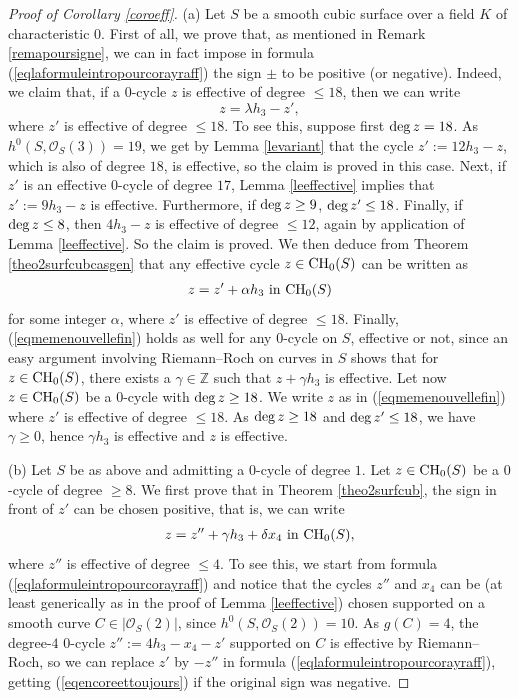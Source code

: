 \documentclass[10pt]{article}
\begin{document}
\begin{proof}[Proof of Corollary \ref{coroeff}]  (a)  Let $S$ be a smooth cubic surface over a field $K$ of characteristic $0$. First of all, we prove that, as mentioned  in Remark \ref{remapoursigne},  we can in fact impose in formula (\ref{eqlaformuleintropourcorayraff}) the sign $\pm$ to be positive (or negative). Indeed, we claim that, if a $0$-cycle  $z$ is effective of degree $\leq 18$, then we can write
$$z=\lambda h_3-z',$$
where $z'$ is effective of degree $\leq 18$. To see this, suppose first ${\rm deg}\,z=18$. As $h^0(S,\mathcal{O}_S(3))=19$, we get by  Lemma \ref{levariant} that   the cycle $z':=12 h_3-z$, which is also  of  degree $18$, is effective, so the claim is proved in this case. Next, if $z'$ is an effective $0$-cycle of degree $17$, Lemma \ref{leeffective} implies that $z':=9h_3-z$ is effective. Furthermore, if ${\rm deg}\,z\geq 9$, ${\rm deg}\,z'\leq 18$. Finally, if ${\rm deg}\,z\leq 8$, then $4h_3-z$ is effective of degree $\leq 12$, again by application of Lemma \ref{leeffective}. So the claim is proved. We then deduce from Theorem \ref{theo2surfcubcasgen} that any effective cycle
$z\in{\rm CH}_0(S)$ can be written as
\begin{eqnarray}\label{eqmemenouvellefin} z=z'+\alpha h_3\,\,{\rm in}\,\,{\rm CH}_0(S)\end{eqnarray}
for some integer $\alpha$, where $z'$ is effective of degree $\leq 18$.
Finally, (\ref{eqmemenouvellefin}) holds as well for any $0$-cycle on $S$, effective or not, since an easy argument involving Riemann--Roch on curves in $S$ shows that for $z\in{\rm CH}_0(S)$, there exists a $\gamma\in\mathbb{Z}$ such that $z+\gamma h_3$ is effective.
Let now  $z\in{\rm CH}_0(S)$ be a $0$-cycle with ${\rm deg}\,z\geq 18$. We write $z$ as in (\ref{eqmemenouvellefin})
where $z'$ is effective of degree $\leq 18$.
As ${\rm deg}\,z\geq 18$ and ${\rm deg}\,z'\leq 18$, we have $\gamma \geq 0$, hence $\gamma h_3$ is effective and $z$ is effective.

\vspace{0.5cm}

(b) Let $S$  be as above and admitting a $0$-cycle of degree $1$. Let $z\in {\rm CH}_0(S)$ be a $0$-cycle of degree $\geq 8$. We first prove that in Theorem \ref{theo2surfcub},  the sign in front of $z'$ can be chosen positive, that is, we can write
\begin{eqnarray} \label{eqencoreettoujours}z= z''+\gamma h_3 +\delta x_4\,\,{\rm in}\,\,{\rm CH}_0(S),\end{eqnarray}
where $z''$ is  effective of degree $\leq 4$.
To see this, we start from formula (\ref{eqlaformuleintropourcorayraff}) and notice that the cycles $z''$ and $x_4$ can be (at least generically as in the proof of Lemma \ref{leeffective}) chosen supported on a smooth curve $C\in |\mathcal{O}_S(2)|$, since $h^0(S,\mathcal{O}_S(2))=10$. As $g(C)=4$, the degree-$4$ $0$-cycle $z'':=4h_3-x_4-z'$ supported on $C$ is effective by Riemann--Roch, so we can replace $z'$ by $-z''$ in formula (\ref{eqlaformuleintropourcorayraff}), getting (\ref{eqencoreettoujours}) if the original sign was negative.


\end{proof}
\end{document}
